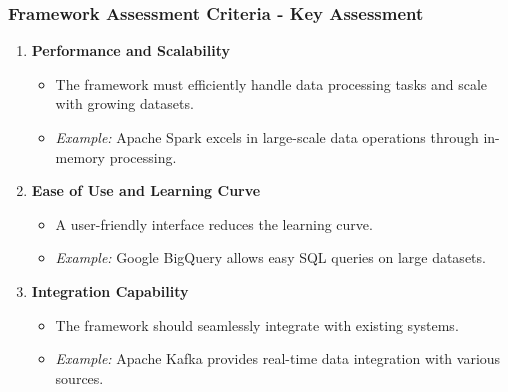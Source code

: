 \documentclass[aspectratio=169]{beamer}
\begin{document}
\begin{frame}[fragile]
    \frametitle{Framework Assessment Criteria - Key Assessment}
    \begin{enumerate}
        \item \textbf{Performance and Scalability}
            \begin{itemize}
                \item The framework must efficiently handle data processing tasks and scale with growing datasets.
                \item \textit{Example:} Apache Spark excels in large-scale data operations through in-memory processing.
            \end{itemize}
        
        \item \textbf{Ease of Use and Learning Curve}
            \begin{itemize}
                \item A user-friendly interface reduces the learning curve.
                \item \textit{Example:} Google BigQuery allows easy SQL queries on large datasets.
            \end{itemize}
        
        \item \textbf{Integration Capability}
            \begin{itemize}
                \item The framework should seamlessly integrate with existing systems.
                \item \textit{Example:} Apache Kafka provides real-time data integration with various sources.
            \end{itemize}
    \end{enumerate}
\end{frame}
\end{document}
